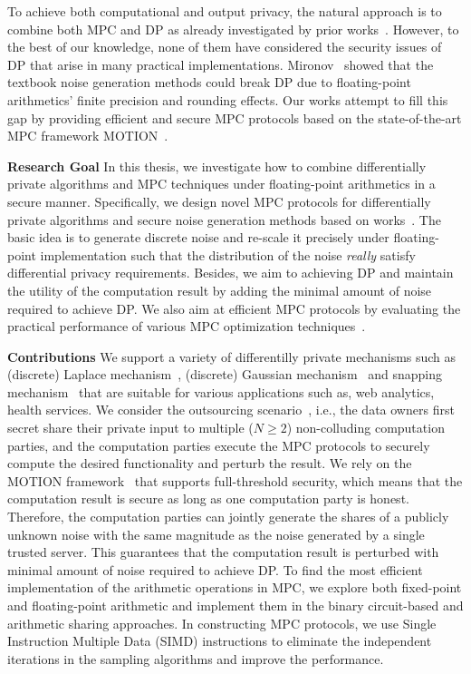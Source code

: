 To achieve both computational and output privacy, the natural approach is to combine both MPC and DP as already investigated by prior works~\cite{eigner2014differentially, pettai2015combining, byrd2020differentially}. However, to the best of our knowledge, none of them have considered the security issues of DP that arise in many practical implementations. Mironov~\cite{mironov2012significance} showed that the textbook noise generation methods could break DP due to floating-point arithmetics' finite precision and rounding effects. Our works attempt to fill this gap by providing efficient and secure MPC protocols based on the state-of-the-art MPC framework MOTION~\cite{braun2020motion}.

\textbf{Research Goal}
In this thesis, we investigate how to combine differentially private algorithms and MPC techniques under floating-point arithmetics in a secure manner. Specifically, we design novel MPC protocols for differentially private algorithms and secure noise generation methods based on works~\cite{mironov2012significance,googleDP2019,canonne2020discrete}. The basic idea is to generate discrete noise and re-scale it precisely under floating-point implementation such that the distribution of the noise \textit{really} satisfy differential privacy requirements. Besides, we aim to achieving DP and maintain the utility of the computation result by adding the minimal amount of noise required to achieve DP. We also aim at efficient MPC protocols by evaluating the practical performance of various MPC optimization techniques~\cite{braun2020motion}.

\textbf{Contributions}
We support a variety of differentilly private mechanisms such as (discrete) Laplace mechanism~\cite{chan2012privacy,ghosh2012universally,dwork2014algorithmic}, (discrete) Gaussian mechanism~\cite{dwork2014algorithmic, canonne2020discrete} and snapping mechanism~\cite{mironov2012significance} that are suitable for various applications such as, web analytics, health services.
We consider the outsourcing scenario~\cite{kamara2011secure}, i.e., the data owners first secret share their private input to multiple ($N \geq 2$) non-colluding computation parties, and the computation parties execute the MPC protocols to securely compute the desired functionality and perturb the result. We rely on the MOTION framework~\cite{braun2020motion} that supports full-threshold security, which means that the computation result is secure as long as one computation party is honest. Therefore, the computation parties can jointly generate the shares of a publicly unknown noise with the same magnitude as the noise generated by a single trusted server.
This guarantees that the computation result is perturbed with minimal amount of noise required to achieve DP.
To find the most efficient implementation of the arithmetic operations in MPC, we explore both fixed-point and floating-point arithmetic and implement them in the binary circuit-based and arithmetic sharing approaches.
In constructing MPC protocols, we use Single Instruction Multiple Data (SIMD) instructions to eliminate the independent iterations in the sampling algorithms and improve the performance.

